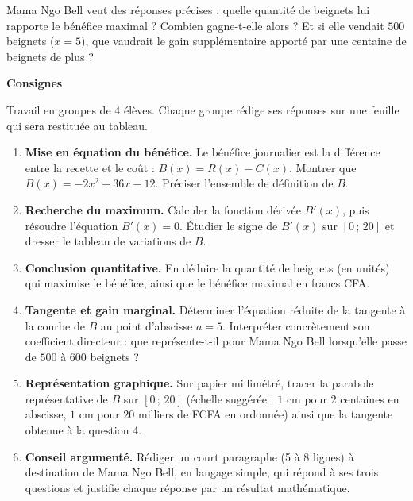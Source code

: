 \documentclass[11pt]{article}
\begin{document}
Mama Ngo Bell veut des réponses précises : quelle quantité de beignets lui rapporte le bénéfice maximal ? Combien gagne-t-elle alors ? Et si elle vendait $500$ beignets ($x = 5$), que vaudrait le gain supplémentaire apporté par une centaine de beignets de plus ?

\textbf{Consignes}\par
Travail en groupes de 4 élèves. Chaque groupe rédige ses réponses sur une feuille qui sera restituée au tableau.

\begin{enumerate}
\item \textbf{Mise en équation du bénéfice.} Le bénéfice journalier est la différence entre la recette et le coût : $B(x) = R(x) - C(x)$. Montrer que $B(x) = -2x^2 + 36x - 12$. Préciser l'ensemble de définition de $B$.
\item \textbf{Recherche du maximum.} Calculer la fonction dérivée $B'(x)$, puis résoudre l'équation $B'(x) = 0$. Étudier le signe de $B'(x)$ sur $[0\,;\,20]$ et dresser le tableau de variations de $B$.
\item \textbf{Conclusion quantitative.} En déduire la quantité de beignets (en unités) qui maximise le bénéfice, ainsi que le bénéfice maximal en francs CFA.
\item \textbf{Tangente et gain marginal.} Déterminer l'équation réduite de la tangente à la courbe de $B$ au point d'abscisse $a = 5$. Interpréter concrètement son coefficient directeur : que représente-t-il pour Mama Ngo Bell lorsqu'elle passe de $500$ à $600$ beignets ?
\item \textbf{Représentation graphique.} Sur papier millimétré, tracer la parabole représentative de $B$ sur $[0\,;\,20]$ (échelle suggérée : $1$ cm pour $2$ centaines en abscisse, $1$ cm pour $20$ milliers de FCFA en ordonnée) ainsi que la tangente obtenue à la question 4.
\item \textbf{Conseil argumenté.} Rédiger un court paragraphe (5 à 8 lignes) à destination de Mama Ngo Bell, en langage simple, qui répond à ses trois questions et justifie chaque réponse par un résultat mathématique.
\end{enumerate}
\end{document}

